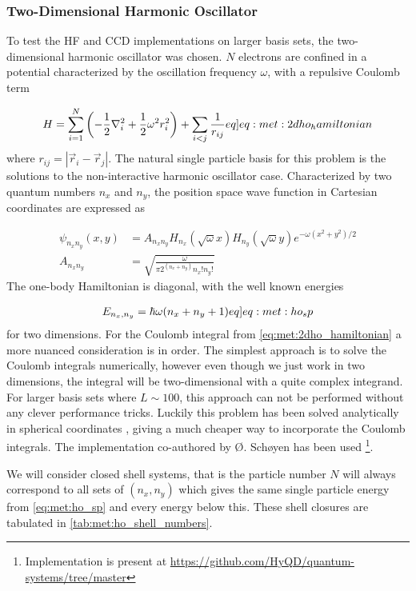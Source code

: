 \subsubsection{Two-Dimensional Harmonic Oscillator}
To test the HF and CCD implementations on larger basis sets, the two-dimensional harmonic oscillator was chosen. $N$ electrons are confined in a potential characterized by the oscillation frequency $\omega$, with a repulsive Coulomb term

\begin{align}
    H = \sum_{i=1}^N \pclosed{-\frac{1}{2}\nabla_i^2 + \frac{1}{2}\omega^2 r_i^2} + \sum_{i < j} \frac{1}{r_{ij}} \label[eq]{eq:met:2dho_hamiltonian}
\end{align}
where $r_{ij} = |\vec{r}_i - \vec{r}_j|$. The natural single particle basis for this problem is the solutions to the non-interactive harmonic oscillator case. Characterized by two quantum numbers $n_x$ and $n_y$, the position space wave function in Cartesian coordinates are expressed as 

\begin{align*}
    \psi_{n_x n_y} (x,y) &= A_{n_x n_y} H_{n_{x}} (\sqrt{\omega}x) H_{n_{y}} (\sqrt{\omega}y) e^{-\omega (x^2 + y^2)/2} \\
    A_{n_x n_y} &= \sqrt{\frac{\omega}{\pi 2^{(n_x+n_y)}n_x ! n_y !}}
\end{align*}
The one-body Hamiltonian is diagonal, with the well known energies

\begin{align}
    E_{n_x,n_y} = \hbar \omega (n_x + n_y + 1) \label[eq]{eq:met:ho_sp}
\end{align}
for two dimensions. For the Coulomb integral from \cref{eq:met:2dho_hamiltonian} a more nuanced consideration is in order. The simplest approach is to solve the Coulomb integrals numerically, however even though we just work in two dimensions, the integral will be two-dimensional with a quite complex integrand. For larger basis sets where $L \sim 100$, this approach can not be performed without any clever performance tricks. Luckily this problem has been solved analytically in spherical coordinates \citep{anisimovasEnergySpectraFewelectron1998}, giving a much cheaper way to incorporate the Coulomb integrals. The implementation co-authored by Ø. Schøyen has been used \footnote{Implementation is present at \url{https://github.com/HyQD/quantum-systems/tree/master}}.

We will consider closed shell systems, that is the particle number $N$ will always correspond to all sets of $(n_x, n_y)$ which gives the same single particle energy from \cref{eq:met:ho_sp} and every energy below this. These shell closures are tabulated in \cref{tab:met:ho_shell_numbers}.

